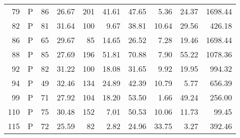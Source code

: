\begin{table}[ht]
\begin{tabular}{rlrrrrrrrr}
  79 & P &  86 & 26.67 & 201 & 41.61 & 47.65 & 5.36 & 24.37 & 1698.44 \\ 
  82 & P &  81 & 31.64 & 100 & 9.67 & 38.81 & 10.64 & 29.56 & 426.18 \\ 
  86 & P &  65 & 29.67 &  85 & 14.65 & 26.52 & 7.28 & 19.46 & 1698.44 \\ 
  88 & P &  85 & 27.69 & 196 & 51.81 & 70.88 & 7.90 & 55.22 & 1078.36 \\ 
  92 & P &  82 & 31.22 & 100 & 18.08 & 31.65 & 9.92 & 19.95 & 994.32 \\ 
  94 & P &  49 & 32.46 & 134 & 24.89 & 42.39 & 10.79 & 5.77 & 656.39 \\ 
  99 & P &  71 & 27.92 & 104 & 18.20 & 53.50 & 1.66 & 49.24 & 256.00 \\ 
  110 & P &  75 & 30.48 & 152 & 7.01 & 50.53 & 10.06 & 11.73 & 99.45 \\ 
  115 & P &  72 & 25.59 &  82 & 2.82 & 24.96 & 33.75 & 3.27 & 392.46 \\ 
   \hline
\end{tabular}
\end{table}
